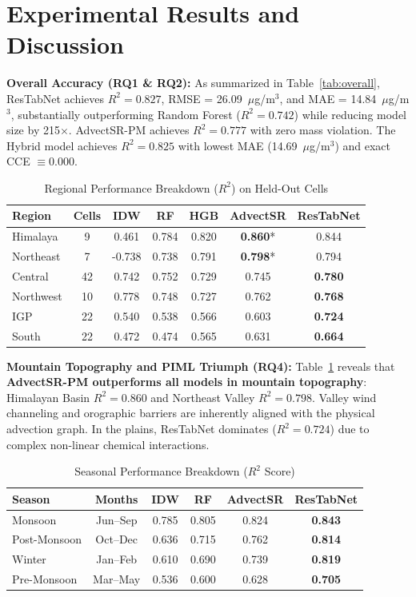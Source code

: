 \documentclass[conference]{IEEEtran}
\begin{document}
\section{Experimental Results and Discussion}
\textbf{Overall Accuracy (RQ1 \& RQ2):} As summarized in Table~\ref{tab:overall}, ResTabNet achieves $R^2 = 0.827$, RMSE = 26.09~$\mu$g/m$^3$, and MAE = 14.84~$\mu$g/m$^3$, substantially outperforming Random Forest ($R^2 = 0.742$) while reducing model size by 215$\times$. AdvectSR-PM achieves $R^2 = 0.777$ with zero mass violation. The Hybrid model achieves $R^2 = 0.825$ with lowest MAE (14.69~$\mu$g/m$^3$) and exact CCE $\equiv 0.000$.

\begin{table}[t]
\caption{Regional Performance Breakdown ($R^2$) on Held-Out Cells}
\centering
\begin{tabular}{lcccccc}
\toprule
\textbf{Region} & \textbf{Cells} & \textbf{IDW} & \textbf{RF} & \textbf{HGB} & \textbf{AdvectSR} & \textbf{ResTabNet} \\
\midrule
Himalaya & 9 & 0.461 & 0.784 & 0.820 & \textbf{0.860}* & 0.844 \\
Northeast & 7 & -0.738 & 0.738 & 0.791 & \textbf{0.798}* & 0.794 \\
Central & 42 & 0.742 & 0.752 & 0.729 & 0.745 & \textbf{0.780} \\
Northwest & 10 & 0.778 & 0.748 & 0.727 & 0.762 & \textbf{0.768} \\
IGP & 22 & 0.540 & 0.538 & 0.566 & 0.603 & \textbf{0.724} \\
South & 22 & 0.472 & 0.474 & 0.565 & 0.631 & \textbf{0.664} \\
\bottomrule
\end{tabular}
\label{tab:regional}
\end{table}

\textbf{Mountain Topography and PIML Triumph (RQ4):} Table~\ref{tab:regional} reveals that \textbf{AdvectSR-PM outperforms all models in mountain topography}: Himalayan Basin $R^2 = \mathbf{0.860}$ and Northeast Valley $R^2 = \mathbf{0.798}$. Valley wind channeling and orographic barriers are inherently aligned with the physical advection graph. In the plains, ResTabNet dominates ($R^2 = 0.724$) due to complex non-linear chemical interactions.

\begin{table}[t]
\caption{Seasonal Performance Breakdown ($R^2$ Score)}
\centering
\begin{tabular}{lccccc}
\toprule
\textbf{Season} & \textbf{Months} & \textbf{IDW} & \textbf{RF} & \textbf{AdvectSR} & \textbf{ResTabNet} \\
\midrule
Monsoon & Jun--Sep & 0.785 & 0.805 & 0.824 & \textbf{0.843} \\
Post-Monsoon & Oct--Dec & 0.636 & 0.715 & 0.762 & \textbf{0.814} \\
Winter & Jan--Feb & 0.610 & 0.690 & 0.739 & \textbf{0.819} \\
Pre-Monsoon & Mar--May & 0.536 & 0.600 & 0.628 & \textbf{0.705} \\
\bottomrule
\end{tabular}
\label{tab:seasonal}
\end{table}
\end{document}
